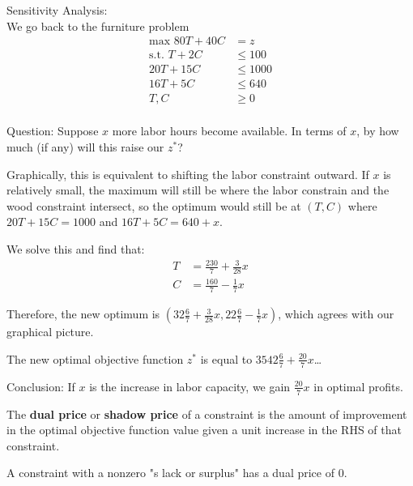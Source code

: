\documentclass{article}
\begin{document}
Sensitivity Analysis: \\
We go back to the furniture problem
\begin{align*}
    \text{max }80T+40C&=z \\
    \text{s.t. }T+2C&\leq100 \\
    20T+15C&\leq1000 \\
    16T+5C&\leq640 \\
    T,C&\geq0 \\
\end{align*}

Question: Suppose \(x\) more labor hours become available. In terms of \(x\), 
by how much (if any) will this raise our \(z^*\)?

Graphically, this is equivalent to shifting the labor constraint outward. If 
\(x\) is relatively small, the maximum will still be where the labor constrain and 
the wood constraint intersect, so the optimum would still be at \((T,C)\) where 
\(20T+15C=1000\) and \(16T+5C=640+x\).

We solve this and find that: \\
\begin{align*}
    T&=\frac{230}{7}+\frac{3}{28}x \\
    C&=\frac{160}{7}-\frac{1}{7}x
\end{align*}

Therefore, the new optimum is \((32 \frac{6}{7}+\frac{3}{28}x, 22 \frac{6}{7}-\frac{1}{7}x)\), 
which agrees with our graphical picture. 

The new optimal objective function \(z^*\) is equal to \(3542 \frac{6}{7}+\frac{20}{7}x\)\dots

Conclusion: If \(x\) is the increase in labor capacity, we gain \(\frac{20}{7}x\) in optimal profits. 

\begin{definition}
    The \textbf{dual price} or \textbf{shadow price} of a constraint is the amount of improvement in the 
    optimal objective function value given a unit increase in the RHS of that constraint.
\end{definition}

A constraint with a nonzero "s lack or surplus" has a dual price of 0.
\end{document}
